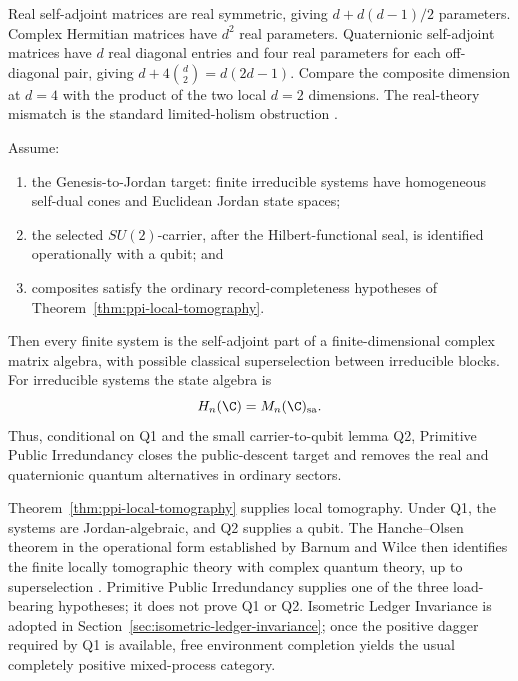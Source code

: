 \begin{proofsketch}
Real self-adjoint matrices are real symmetric, giving
\(d+d(d-1)/2\) parameters.  Complex Hermitian matrices have \(d^2\) real parameters.
Quaternionic self-adjoint matrices have \(d\) real diagonal entries and four real
parameters for each off-diagonal pair, giving
\(d+4\binom d2=d(2d-1)\).  Compare the composite dimension at \(d=4\) with the
product of the two local \(d=2\) dimensions.  The real-theory mismatch is the
standard limited-holism obstruction \cite{hardy-wootters-real}.
\end{proofsketch}

\begin{theorem}
\label{thm:conditional-complex-reconstruction-ppi}
Assume:
\begin{enumerate}[label=\textup{Q\arabic*},leftmargin=2.4em]
\item the Genesis-to-Jordan target: finite irreducible systems have homogeneous
      self-dual cones and Euclidean Jordan state spaces;
\item the selected \(SU(2)\)-carrier, after the Hilbert-functional seal, is identified
      operationally with a qubit; and
\item composites satisfy the ordinary record-completeness hypotheses of
      Theorem~\ref{thm:ppi-local-tomography}.
\end{enumerate}
Then every finite system is the self-adjoint part of a finite-dimensional complex
matrix algebra, with possible classical superselection between irreducible blocks.
For irreducible systems the state algebra is
\[
  H_n(\C)=M_n(\C)_{\mathrm{sa}}.
\]
Thus, conditional on Q1 and the small carrier-to-qubit lemma Q2, Primitive Public
Irredundancy closes the public-descent target and removes the real and quaternionic
quantum alternatives in ordinary sectors.
\end{theorem}

\begin{proofsketch}
Theorem~\ref{thm:ppi-local-tomography} supplies local tomography.  Under Q1, the
systems are Jordan-algebraic, and Q2 supplies a qubit.  The Hanche--Olsen theorem in
the operational form established by Barnum and Wilce then identifies the finite
locally tomographic theory with complex quantum theory, up to superselection
\cite{barnum-wilce-local}.  Primitive Public Irredundancy supplies one of the three
load-bearing hypotheses; it does not prove Q1 or Q2.  Isometric Ledger Invariance
is adopted in Section~\ref{sec:isometric-ledger-invariance}; once the positive
dagger required by Q1 is available, free environment completion yields the usual
completely positive mixed-process category.
\end{proofsketch}

